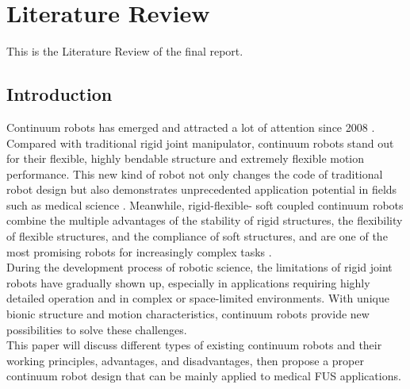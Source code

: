 \section{Literature Review} 
This is the Literature Review of the final report.
\subsection{Introduction}
Continuum robots has emerged and attracted a lot of attention since 2008 \cite{review_2008}. Compared with traditional rigid 
joint manipulator, continuum robots stand out for their flexible, highly bendable structure and extremely flexible motion 
performance. This new kind of robot not only changes the code of traditional robot design but also demonstrates unprecedented 
application potential in fields such as medical science \cite{CR_medical_application}. Meanwhile, rigid-flexible-
soft coupled continuum robots combine the multiple advantages of the stability of rigid structures, the flexibility of flexible 
structures, and the compliance of soft structures, and are one of the most promising robots for increasingly complex tasks 
\cite{fishboneCR}. \\
During the development process of robotic science, the limitations of rigid joint robots have gradually shown up, especially 
in applications requiring highly detailed operation and in complex or space-limited environments. With unique bionic structure 
and motion characteristics, continuum robots provide new possibilities to solve these challenges. \\
This paper will discuss different types of existing continuum robots and their working principles, advantages, and disadvantages, 
then propose a proper continuum robot design that can be mainly applied to medical FUS applications.
